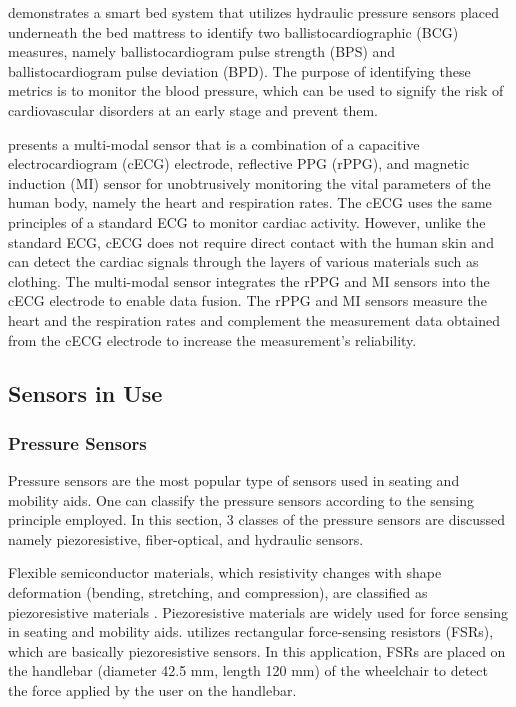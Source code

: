 \textcite{su_monitoring_2019} demonstrates a smart bed system that utilizes hydraulic pressure sensors placed underneath the bed mattress to identify two ballistocardiographic (BCG) measures, namely ballistocardiogram pulse strength (BPS) and ballistocardiogram pulse deviation (BPD). The purpose of identifying these metrics is to monitor the blood pressure, which can be used to signify the risk of cardiovascular disorders at an early stage and prevent them. 

\textcite{yu_multi-modal_2019} presents a multi-modal sensor that is a combination of a capacitive electrocardiogram (cECG) electrode, reflective PPG (rPPG), and magnetic induction (MI) sensor for unobtrusively monitoring the vital parameters of the human body, namely the heart and respiration rates. The cECG uses the same principles of a standard ECG to monitor cardiac activity. However, unlike the standard ECG, cECG does not require direct contact with the human skin and can detect the cardiac signals through the layers of various materials such as clothing. The multi-modal sensor integrates the rPPG and MI sensors into the cECG electrode to enable data fusion. The rPPG and MI sensors measure the heart and the respiration rates and complement the measurement data obtained from the cECG electrode to increase the measurement's reliability.


\subsection{Sensors in Use}

\subsubsection{Pressure Sensors} 

Pressure sensors are the most popular type of sensors used in seating and mobility aids. One can classify the pressure sensors according to the sensing principle employed. In this section, 3 classes of the pressure sensors are discussed namely piezoresistive, fiber-optical, and hydraulic sensors. %



Flexible semiconductor materials, which resistivity changes with shape deformation (bending, stretching, and compression), are classified as piezoresistive materials \parencite{morris_chapter_2016}. Piezoresistive materials are widely used for force sensing in seating and mobility aids. \textcite{trujillo-leon_tactile_2018} utilizes rectangular force-sensing resistors (FSRs), which are basically piezoresistive sensors. In this application, FSRs are placed on the handlebar (diameter 42.5 mm, length 120 mm) of the wheelchair to detect the force applied by the user on the handlebar.

